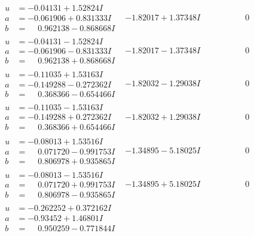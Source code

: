\documentclass[1p]{elsarticle_modified}
\theoremstyle{definition}
\begin{document}
$$\begin{array}{c|c|c}
 \hline 
\begin{aligned}
u &= -0.04131 + 1.52824 I \\
a &= -0.061906 + 0.831333 I \\
b &= \phantom{-}0.962138 - 0.868668 I\end{aligned}
 & -1.82017 + 1.37348 I & \phantom{-0.000000 } 0 \\ \hline\begin{aligned}
u &= -0.04131 - 1.52824 I \\
a &= -0.061906 - 0.831333 I \\
b &= \phantom{-}0.962138 + 0.868668 I\end{aligned}
 & -1.82017 - 1.37348 I & \phantom{-0.000000 } 0 \\ \hline\begin{aligned}
u &= -0.11035 + 1.53163 I \\
a &= -0.149288 - 0.272362 I \\
b &= \phantom{-}0.368366 - 0.654466 I\end{aligned}
 & -1.82032 - 1.29038 I & \phantom{-0.000000 } 0 \\ \hline\begin{aligned}
u &= -0.11035 - 1.53163 I \\
a &= -0.149288 + 0.272362 I \\
b &= \phantom{-}0.368366 + 0.654466 I\end{aligned}
 & -1.82032 + 1.29038 I & \phantom{-0.000000 } 0 \\ \hline\begin{aligned}
u &= -0.08013 + 1.53516 I \\
a &= \phantom{-}0.071720 - 0.991753 I \\
b &= \phantom{-}0.806978 + 0.935865 I\end{aligned}
 & -1.34895 - 5.18025 I & \phantom{-0.000000 } 0 \\ \hline\begin{aligned}
u &= -0.08013 - 1.53516 I \\
a &= \phantom{-}0.071720 + 0.991753 I \\
b &= \phantom{-}0.806978 - 0.935865 I\end{aligned}
 & -1.34895 + 5.18025 I & \phantom{-0.000000 } 0 \\ \hline\begin{aligned}
u &= -0.262252 + 0.372162 I \\
a &= -0.93452 + 1.46801 I \\
b &= \phantom{-}0.950259 - 0.771844 I\end{aligned}

\end{array}$$
\end{document}
